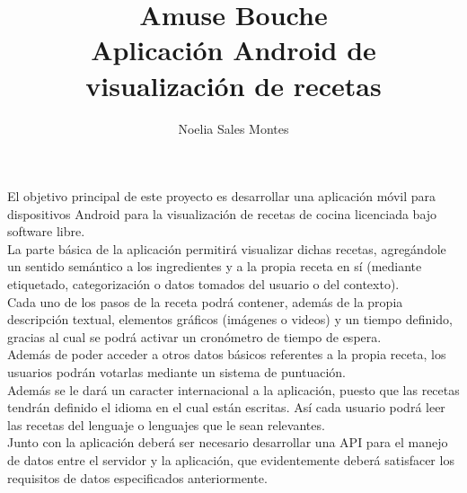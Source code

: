 \documentclass[a4paper,11pt]{article}
\title{Amuse Bouche\\Aplicación Android de visualización de recetas}
\author{Noelia Sales Montes}
\date{\fecha}
\begin{document}
\maketitle

\vspace*{1cm}

El objetivo principal de este proyecto es desarrollar una aplicación móvil para dispositivos Android para la visualización de recetas de cocina licenciada bajo software libre.\\

La parte básica de la aplicación permitirá visualizar dichas recetas, agregándole un sentido semántico a los ingredientes y a la propia receta en sí (mediante etiquetado, categorización o datos tomados del usuario o del contexto).\\

Cada uno de los pasos de la receta podrá contener, además de la propia descripción textual, elementos gráficos (imágenes o videos) y un tiempo definido, gracias al cual se podrá activar un cronómetro de tiempo de espera.\\

Además de poder acceder a otros datos básicos referentes a la propia receta, los usuarios podrán votarlas mediante un sistema de puntuación.\\

Además se le dará un caracter internacional a la aplicación, puesto que las recetas tendrán definido el idioma en el cual están escritas. Así cada usuario podrá leer las recetas del lenguaje o lenguajes que le sean relevantes.\\

Junto con la aplicación deberá ser necesario desarrollar una API para el manejo de datos entre el servidor y la aplicación, que evidentemente deberá satisfacer los requisitos de datos especificados anteriormente.
\end{document}
